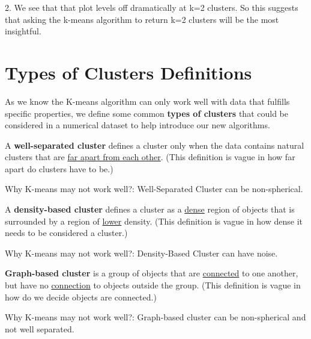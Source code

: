 \documentclass[11pt]{elegantbook}
\begin{document}
2. We see that that plot levels off dramatically at k=2 clusters. So this suggests that asking the k-means algorithm to return k=2 clusters will be the most insightful.

\section{Types of Clusters Definitions}
As we know the K-means algorithm can only work well with data that fulfills specific properties, we define some common \textbf{types of clusters} that could be considered in a numerical dataset to help introduce our new algorithms.

\begin{definition}
    A \textbf{well-separated cluster} defines a cluster only when the data contains natural clusters that are \underline{far apart from each other}. (This definition is vague in how far apart do clusters have to be.)
\end{definition}
Why K-means may not work well?: Well-Separated Cluster can be non-spherical.
\begin{definition}
    A \textbf{density-based cluster} defines a cluster as a \underline{dense} region of objects that is surrounded by a region of \underline{lower} density. (This definition is vague in how dense it needs to be considered a cluster.)
\end{definition}
Why K-means may not work well?: Density-Based Cluster can have noise.

\begin{definition}
    \textbf{Graph-based cluster} is a group of objects that are \underline{connected} to one another, but have no \underline{connection} to objects outside the group. (This definition is vague in how do we decide objects are connected.)
\end{definition}
Why K-means may not work well?: Graph-based cluster can be non-spherical and not well separated.
\end{document}
